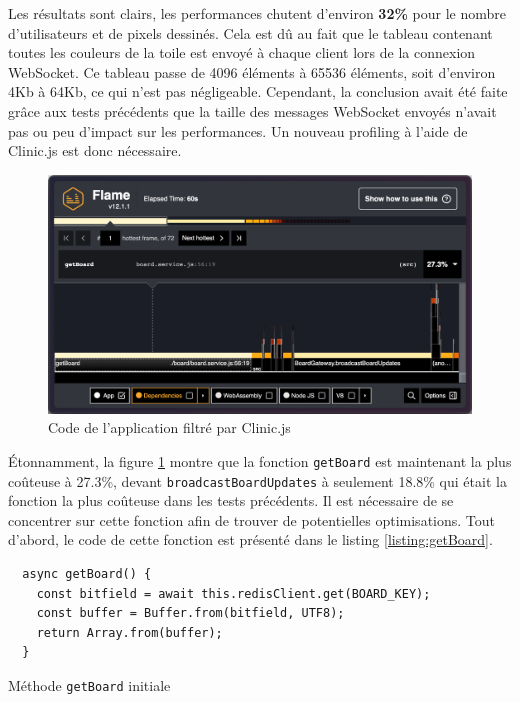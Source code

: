 Les résultats sont clairs, les performances chutent d'environ \textbf{32\%} pour le nombre d'utilisateurs et de pixels dessinés. Cela est dû au fait que le tableau contenant toutes les couleurs de la toile est envoyé à chaque client lors de la connexion WebSocket. Ce tableau passe de 4096 éléments à 65536 éléments, soit d'environ 4Kb à 64Kb, ce qui n'est pas négligeable. Cependant, la conclusion avait été faite grâce aux tests précédents que la taille des messages WebSocket envoyés n'avait pas ou peu d'impact sur les performances. Un nouveau profiling à l'aide de Clinic.js est donc nécessaire.


\begin{figure}[H]
  \centering
  \includegraphics[width=1\textwidth]{./assets/figures/flame/flame3-filtered.png}
  \caption{Code de l'application filtré par Clinic.js}
  \label{fig:flame3-filtered}
\end{figure}

Étonnamment, la figure \ref{fig:flame3-filtered} montre que la fonction \texttt{getBoard} est maintenant la plus coûteuse à 27.3\%, devant \texttt{broadcastBoardUpdates} à seulement 18.8\%  qui était la fonction la plus coûteuse dans les tests précédents. Il est nécessaire de se concentrer sur cette fonction afin de trouver de potentielles optimisations. Tout d'abord, le code de cette fonction est présenté dans le listing \ref{listing:getBoard}.

\begin{listing}[H]
  \begin{verbatim}
  async getBoard() {
    const bitfield = await this.redisClient.get(BOARD_KEY);
    const buffer = Buffer.from(bitfield, UTF8);
    return Array.from(buffer);
  }
\end{verbatim}
  \caption{Méthode \texttt{getBoard} initiale}
  \label{listing:getBoard}
\end{listing}

